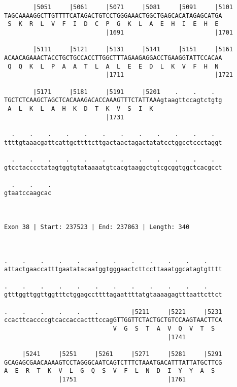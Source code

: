 \documentclass{article}
\begin{document}
\begin{Verbatim}
        |5051     |5061     |5071     |5081     |5091     |5101
TAGCAAAAGGCTTGTTTTCATAGACTGTCCTGGGAAACTGGCTGAGCACATAGAGCATGA
 S  K  R  L  V  F  I  D  C  P  G  K  L  A  E  H  I  E  H  E 
                            |1691                         |1701
  
        |5111     |5121     |5131     |5141     |5151     |5161
ACAACAGAAACTACCTGCTGCCACCTTGGCTTTAGAAGAGGACCTGAAGGTATTCCACAA
 Q  Q  K  L  P  A  A  T  L  A  L  E  E  D  L  K  V  F  H  N 
                            |1711                         |1721
  
        |5171     |5181     |5191     |5201    .    .    .  
TGCTCTCAAGCTAGCTCACAAAGACACCAAAGTTTCTATTAAAgtaagttccagtctgtg
 A  L  K  L  A  H  K  D  T  K  V  S  I  K                   
                            |1731                           
  
  .    .    .    .    .    .    .    .    .    .    .    .  
ttttgtaaacgattcattgcttttcttgactaactagactatatcctggcctccctaggt
                                                            
  .    .    .    .    .    .    .    .    .    .    .    .  
gtcctacccctatagtggtgtataaaatgtcacgtaaggctgtcgcggtggctcacgcct
                                                            
  .    .    .
gtaatccaagcac
             
             
 
Exon 38 | Start: 237523 | End: 237863 | Length: 340



.    .    .    .    .    .    .    .    .    .    .    .    
attactgaaccatttgaatatacaatggtgggaactcttccttaaatggcatagtgtttt
                                                            
.    .    .    .    .    .    .    .    .    .    .    .    
gtttggttggttggtttctggagccttttagaattttatgtaaaagagtttaattcttct
                                                            
.    .    .    .    .    .         |5211     |5221     |5231
ccacttcaccccgtcaccaccactttccagGTTGGTTCTACTGCTGTCCAAGTAACTTCA
                              V  G  S  T  A  V  Q  V  T  S  
                                             |1741          
  
     |5241     |5251     |5261     |5271     |5281     |5291
GCAGAGCGAACAAAAGTCCTAGGGCAATCAGTCTTTCTAAATGACATTTATTATGCTTCG
A  E  R  T  K  V  L  G  Q  S  V  F  L  N  D  I  Y  Y  A  S  
               |1751                         |1761          
  

\end{Verbatim}
\end{document}
